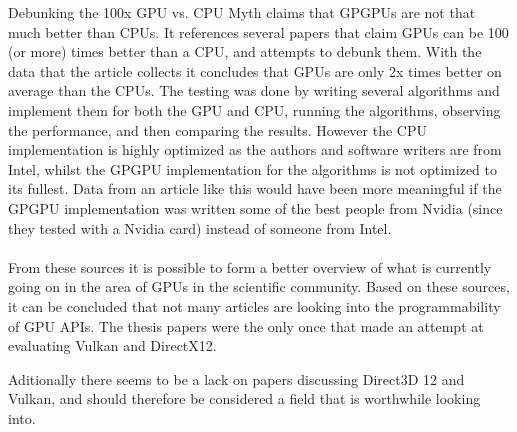 Debunking the 100x \gls{GPU} vs. \gls{CPU} Myth \cite{lee_2010_debunking} claims that GP\glspl{GPU} are not that much better than \glspl{CPU}. 
It references several papers that claim \glspl{GPU} can be 100 (or more) times better than a \gls{CPU}, and attempts to debunk them. 
With the data that the article collects it concludes that \glspl{GPU} are only 2x times better on average than the \glspl{CPU}. 
The testing was done by writing several algorithms and implement them for both the \gls{GPU} and \gls{CPU}, running the algorithms, observing the performance, and then comparing the results. 
However the \gls{CPU} implementation is highly optimized as the authors and software writers are from Intel, whilst the GP\gls{GPU} implementation for the algorithms is not optimized to its fullest. 
Data from an article like this would have been more meaningful if the GP\gls{GPU} implementation was written some of the best people from Nvidia (since they tested with a Nvidia card) instead of someone from Intel.

\paragraph{}
From these sources it is possible to form a better overview of what is currently going on in the area of \glspl{GPU} in the scientific community. 
Based on these sources, it can be concluded that not many articles are looking into the programmability of \gls{GPU} \glspl{API}. 
The thesis papers were the only once that made an attempt at evaluating Vulkan and DirectX12.

Aditionally there seems to be a lack on papers discussing Direct3D 12 and Vulkan, and should therefore be considered a field that is worthwhile looking into.
